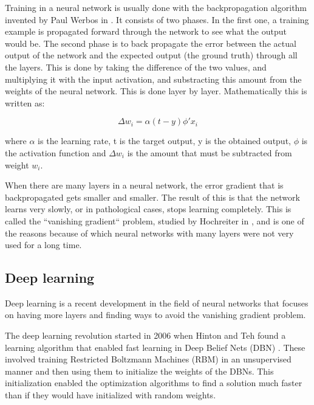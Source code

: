 Training in a neural network is usually done with the backpropagation algorithm invented by Paul Werbos in \cite{werbos1974beyond}. It consists of two phases. In the first one, a training example is propagated forward through the network to see what the output would be. The second phase is to back propagate the error between the actual output of the network and the expected output (the ground truth) through all the layers. This is done by taking the difference of the two values, and multiplying it with the input activation, and substracting this amount from the weights of the neural network. This is done layer by layer. Mathematically this is written as:

\[
 \Delta w_i = \alpha (t - y) \phi' x_i 
\]

where $\alpha$ is the learning rate, t is the target output, y is the obtained output,  $ \phi $ is the activation function and $ \Delta w_i $ is the amount that must be subtracted from weight $ w_i $. 

When there are many layers in a neural network, the error gradient that is backpropagated gets smaller and smaller. The result of this is that the network learns very slowly, or in pathological cases, stops learning completely. This is called the ``vanishing gradient`` problem,  studied by Hochreiter in \cite{hochreiter1998vanishing}, and is one of the reasons because of which neural networks with many layers were not very used for a long time. 

\subsection{Deep learning}

Deep learning is a recent development in the field of neural networks that focuses on having more layers and finding ways to avoid the vanishing gradient problem.

The deep learning revolution started in 2006 when Hinton and Teh found a learning algorithm that enabled fast learning in Deep Belief Nets (DBN) \cite{hinton2006fast}. These involved training Restricted Boltzmann Machines (RBM) in an unsupervised manner and then using them to initialize the weights of the DBNs. This initialization enabled the optimization algorithms to find a solution much faster than if they would have initialized with random weights.

